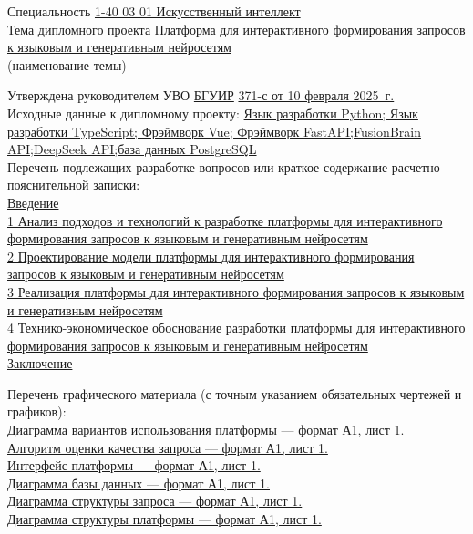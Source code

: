 {\begin{center}
  Специальность \uline{1-40 03 01 Искусственный интеллект}\lineunderscore\\[0.5em]

  Тема дипломного проекта \uline{Платформа для интерактивного формирования
запросов к языковым и генеративным нейросетям}\lineunderscore \\
  {\footnotesize\hspace{15em}(наименование темы)}\\
  \end{center}

  Утверждена руководителем УВО \uline{БГУИР} \textnumero  \uline{371-с от 10 февраля 2025~г.}\lineunderscore\\[-0.5em]
  
  Исходные данные к дипломному проекту: \uline{Язык разработки Python; Язык разработки TypeScript; Фрэймворк Vue; Фрэймворк FastAPI;FusionBrain API;DeepSeek API;база данных PostgreSQL}\lineunderscore\\[0.5em]
  Перечень подлежащих разработке вопросов или краткое содержание расчетно-пояснительной записки: 
  \lineunderscore\\
  \uline{Введение}\lineunderscore\\
  \uline{1 Анализ подходов и технологий к разработке платформы для интерактивного формирования запросов к языковым и генеративным нейросетям}\lineunderscore\\
  \uline{2 Проектирование модели платформы для интерактивного формирования запросов к языковым и генеративным нейросетям}\lineunderscore\\
  \uline{3 Реализация платформы для интерактивного формирования запросов к языковым и генеративным нейросетям}\lineunderscore\\
  \uline{4 Технико-экономическое обоснование разработки платформы для интерактивного формирования запросов к языковым и генеративным нейросетям}\lineunderscore\\
  \uline{Заключение}\lineunderscore\\
  \newpage
  \thispagestyle{empty}

  Перечень графического материала (с точным указанием обязательных чертежей и графиков):
  \lineunderscore\\
  \uline{Диаграмма вариантов использования платформы --- формат А1, лист 1. }\lineunderscore\\
  \uline{Алгоритм оценки качества запроса --- формат А1, лист 1. }\lineunderscore\\
  \uline{Интерфейс платформы --- формат А1, лист 1. }\lineunderscore\\
  \uline{Диаграмма базы данных --- формат А1, лист 1. }\lineunderscore\\
  \uline{Диаграмма структуры запроса --- формат А1, лист 1. }\lineunderscore\\
  \uline{Диаграмма структуры платформы --- формат А1, лист 1. }\lineunderscore\\
  \lineunderscore\\

}
